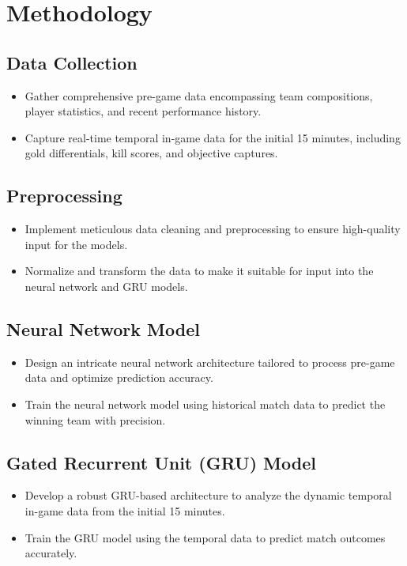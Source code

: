 \documentclass{article}
\begin{document}
\section{Methodology}
\subsection{Data Collection}
\begin{itemize}
  \item Gather comprehensive pre-game data encompassing team compositions, player statistics, and recent performance history.
  \item Capture real-time temporal in-game data for the initial 15 minutes, including gold differentials, kill scores, and objective captures.
\end{itemize}

\subsection{Preprocessing}
\begin{itemize}
  \item Implement meticulous data cleaning and preprocessing to ensure high-quality input for the models.
  \item Normalize and transform the data to make it suitable for input into the neural network and GRU models.
\end{itemize}

\subsection{Neural Network Model}
\begin{itemize}
  \item Design an intricate neural network architecture tailored to process pre-game data and optimize prediction accuracy.
  \item Train the neural network model using historical match data to predict the winning team with precision.
\end{itemize}

\subsection{Gated Recurrent Unit (GRU) Model}
\begin{itemize}
  \item Develop a robust GRU-based architecture to analyze the dynamic temporal in-game data from the initial 15 minutes.
  \item Train the GRU model using the temporal data to predict match outcomes accurately.
\end{itemize}
\end{document}
